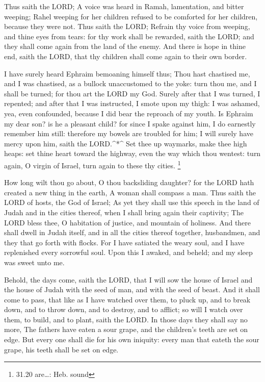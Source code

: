  Thus saith the LORD; A voice was heard in Ramah,
lamentation, and bitter weeping; Rahel weeping for her children refused
to be comforted for her children, because they were not. 
Thus saith the LORD; Refrain thy voice from weeping, and thine eyes from
tears: for thy work shall be rewarded, saith the LORD; and they shall
come again from the land of the enemy.  And there is hope
in thine end, saith the LORD, that thy children shall come again to
their own border.

 I have surely heard Ephraim bemoaning himself thus; Thou
hast chastised me, and I was chastised, as a bullock unaccustomed to the
yoke: turn thou me, and I shall be turned; for thou art the LORD my God.
 Surely after that I was turned, I repented; and after that
I was instructed, I smote upon my thigh: I was ashamed, yea, even
confounded, because I did bear the reproach of my youth. 
Is Ephraim my dear son? is he a pleasant child? for since I spake
against him, I do earnestly remember him still: therefore my bowels are
troubled for him; I will surely have mercy upon him, saith the
LORD.\^{}*\^{}  Set thee up waymarks, make thee high heaps:
set thine heart toward the highway, even the way which thou wentest:
turn again, O virgin of Israel, turn again to these thy cities.
\footnote{31.20 are\ldots: Heb. sound}

 How long wilt thou go about, O thou backsliding daughter?
for the LORD hath created a new thing in the earth, A woman shall
compass a man.  Thus saith the LORD of hosts, the God of
Israel; As yet they shall use this speech in the land of Judah and in
the cities thereof, when I shall bring again their captivity; The LORD
bless thee, O habitation of justice, and mountain of holiness.
 And there shall dwell in Judah itself, and in all the
cities thereof together, husbandmen, and they that go forth with flocks.
 For I have satiated the weary soul, and I have replenished
every sorrowful soul.  Upon this I awaked, and beheld; and
my sleep was sweet unto me.

 Behold, the days come, saith the LORD, that I will sow the
house of Israel and the house of Judah with the seed of man, and with
the seed of beast.  And it shall come to pass, that like as
I have watched over them, to pluck up, and to break down, and to throw
down, and to destroy, and to afflict; so will I watch over them, to
build, and to plant, saith the LORD.  In those days they
shall say no more, The fathers have eaten a sour grape, and the
children's teeth are set on edge.  But every one shall die
for his own iniquity: every man that eateth the sour grape, his teeth
shall be set on edge.

